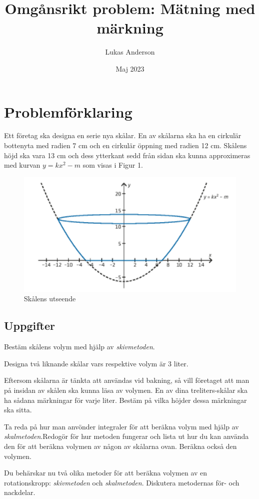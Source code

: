 \documentclass[12pt]{article}
\title{Omgånsrikt problem: Mätning med märkning}
\author{Lukas Anderson}
\date{Maj 2023}
\begin{document}
\maketitle

\section{Problemförklaring}
Ett företag ska designa en serie nya skålar. En av skålarna ska ha en cirkulär bottenyta med radien 7 cm och en cirkulär öppning med radien 12 cm. Skålens höjd ska vara 13 cm och dess ytterkant sedd från sidan ska kunna approximeras med kurvan $y=kx^2-m$ som visas i Figur 1.

\begin{figure}[h]
    \centering
    \includegraphics[width=\textwidth]{figur1.png}
    \caption{Skålens utseende}
\end{figure}

\subsection*{Uppgifter}
\begin{list}{-}{\leftmargin=1em\rightmargin=1em}
    \item Bestäm skålens volym med hjälp av {\it skivmetoden}.
    \item Designa två liknande skålar vars respektive volym är 3 liter.
    \item Eftersom skålarna är tänkta att användas vid bakning, så vill företaget att man på insidan av skålen ska kunna läsa av volymen. En av dina treliters-skålar ska ha sådana märkningar för varje liter. Bestäm på vilka höjder dessa märkningar ska sitta.
    \item Ta reda på hur man anvönder integraler för att beräkna volym med hjälp av {\it skalmetoden}.Redogör för hur metoden fungerar och lista ut hur du kan använda den för att beräkna volymen av någon av skålarna ovan. Beräkna också den volymen.
    \item Du behärskar nu två olika metoder för att beräkna volymen av en rotationskropp: {\it skivmetoden\/} och {\it skalmetoden}. Diskutera metodernas för- och nackdelar.
\end{list}
\end{document}
